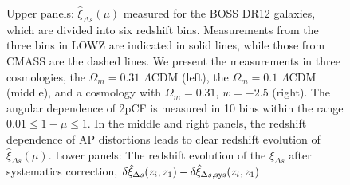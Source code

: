 \documentclass[iop]{emulateapj}
\begin{document}
\begin{figure}
   \caption{\label{fig_TpCF}
   Upper panels: $\hat \xi_{\Delta s}(\mu)$ measured for the BOSS DR12 galaxies,
   which are divided into six redshift bins.
   Measurements from the three bins in LOWZ are indicated in solid lines, 
   while those from CMASS are the dashed lines.
   We present the measurements in three cosmologies,
   the $\Omega_m=0.31$ $\Lambda$CDM (left), the $\Omega_m=0.1$ $\Lambda$CDM (middle),
   and a cosmology with $\Omega_m=0.31$, $w=-2.5$ (right).   
   The angular dependence of 2pCF is measured in 10 bins within the range $0.01\leq1-\mu\leq1$.
   In the middle and right panels, the redshift dependence of AP distortions leads to clear redshift evolution of $\hat \xi_{\Delta s}(\mu)$.
   Lower panels: The redshift evolution of the $\hat\xi_{\Delta s}$ after systematics correction,  
   $\delta\hat \xi_{\Delta s}(z_i,z_1)-\delta\hat \xi_{\Delta s,\rm sys}(z_i,z_1)$
}
\end{figure}
\end{document}
